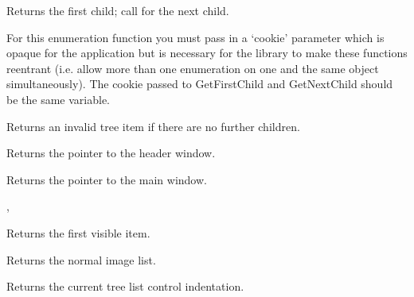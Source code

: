 Returns the first child; call  for the next child.

For this enumeration function you must pass in a `cookie' parameter
which is opaque for the application but is necessary for the library
to make these functions reentrant (i.e. allow more than one
enumeration on one and the same object simultaneously). The cookie passed to
GetFirstChild and GetNextChild should be the same variable.

Returns an invalid tree item if there are no further children.


\label{wxtreelistctrlgetheaderwindow}


Returns the pointer to the header window.

\label{wxtreelistctrlgetmainwindow}


Returns the pointer to the main window.

,



\label{wxtreelistctrlgetfirstvisibleitem}


Returns the first visible item.

\label{wxtreelistctrlgetimagelist}


Returns the normal image list.

\label{wxtreelistctrlgetindent}


Returns the current tree list control indentation.

